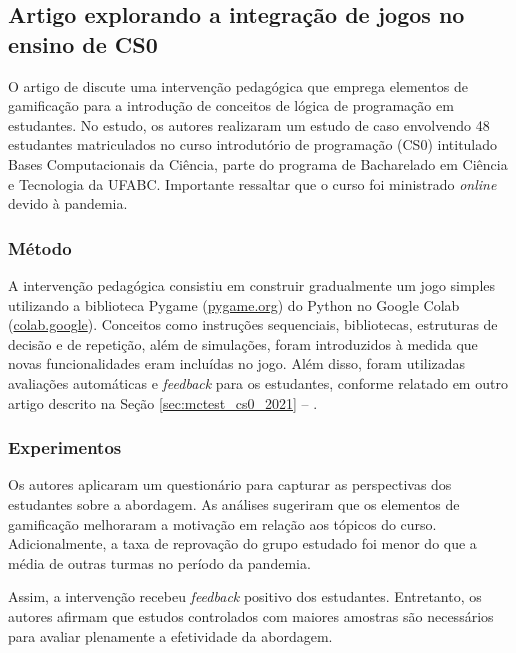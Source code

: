 \subsection{Artigo explorando a integração de jogos no ensino de CS0}

O artigo de  discute uma intervenção pedagógica que emprega elementos de gamificação para a introdução de conceitos de lógica de programação em estudantes. No estudo, os autores realizaram um estudo de caso envolvendo 48 estudantes matriculados no curso introdutório de programação (CS0) intitulado Bases Computacionais da Ciência, parte do programa de Bacharelado em Ciência e Tecnologia da UFABC. Importante ressaltar que o curso foi ministrado \textit{online} devido à pandemia.

\subsubsection{Método}

A intervenção pedagógica consistiu em construir gradualmente um jogo simples utilizando a biblioteca Pygame (\href{https://www.pygame.org/news}{pygame.org}) do Python no Google Colab (\href{https://colab.google/}{colab.google}). Conceitos como instruções sequenciais, bibliotecas, estruturas de decisão e de repetição, além de simulações, foram introduzidos à medida que novas funcionalidades eram incluídas no jogo. Além disso, foram utilizadas avaliações automáticas e \textit{feedback} para os estudantes, conforme relatado em outro artigo descrito na Seção \ref{sec:mctest_cs0_2021} -- .

\subsubsection{Experimentos}

Os autores aplicaram um questionário para capturar as perspectivas dos estudantes sobre a abordagem. As análises sugeriram que os elementos de gamificação melhoraram a motivação em relação aos tópicos do curso. Adicionalmente, a taxa de reprovação do grupo estudado foi menor do que a média de outras turmas no período da pandemia.

Assim, a intervenção recebeu \textit{feedback} positivo dos estudantes. Entretanto, os autores afirmam que estudos controlados com maiores amostras são necessários para avaliar plenamente a efetividade da abordagem. 


